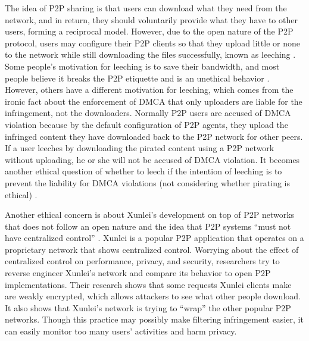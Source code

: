 \documentclass[12pt]{article}
\begin{document}
The idea of P2P sharing is that users can download what they need from the network, and in return, they should voluntarily provide what they have to other users, forming a reciprocal model. However, due to the open nature of the P2P protocol, users may configure their P2P clients so that they upload little or none to the network while still downloading the files successfully, known as leeching \cite{54_d2014bittorrent}. Some people's motivation for leeching is to save their bandwidth, and most people believe it breaks the P2P etiquette and is an unethical behavior%
. However, others have a different motivation for leeching, which comes from the ironic fact about the enforcement of DMCA that only uploaders are liable for the infringement, not the downloaders. Normally P2P users are accused of DMCA violation because by the default configuration of P2P agents, they upload the infringed content they have downloaded back to the P2P network for other peers. If a user leeches by downloading the pirated content using a P2P network without uploading, he or she will not be accused of DMCA violation. It becomes another ethical question of whether to leech if the intention of leeching is to prevent the liability for DMCA violations (not considering whether pirating is ethical) \cite{24_P2PLeecher}. 

Another ethical concern is about Xunlei's development on top of P2P networks that does not follow an open nature and the idea that P2P systems ``must not have centralized control'' \cite{07_7907024}. Xunlei is a popular P2P application that operates on a proprietary network that shows centralized control. Worrying about the effect of centralized control on performance, privacy, and security, researchers try to reverse engineer Xunlei's network and compare its behavior to open P2P implementations. Their research shows that some requests Xunlei clients make are weakly encrypted, which allows attackers to see what other people download. It also shows that Xunlei's network is trying to ``wrap'' the other popular P2P networks. Though this practice may possibly make filtering infringement easier, it can easily monitor too many users' activities and harm privacy. 
\end{document}
